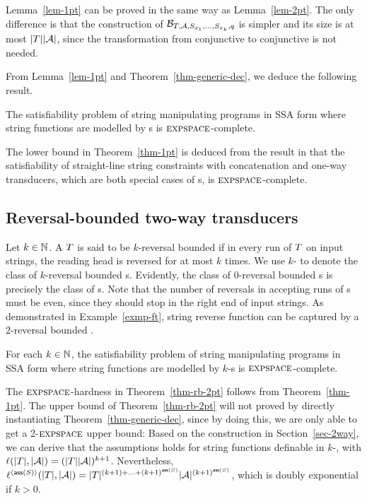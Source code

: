 Lemma~\ref{lem-1pt} can be proved in the same way as Lemma~\ref{lem-2pt}. The only difference is that the construction of $\mathcal{B}_{T, \mathcal{A}, S_{x_1}, \ldots, S_{x_k}, q}$ is simpler and its size is at most $|T| |\mathcal{A}|$, since the transformation from  conjunctive \FFA{} to conjunctive \FA{} is not needed.

From Lemma~\ref{lem-1pt} and Theorem~\ref{thm-generic-dec}, we deduce the following result.
%
\begin{theorem} \label{thm-1pt}
The satisfiability problem of string manipulating programs in SSA form where string functions are modelled by \PT{}s is $\textsc{expspace}$-complete. 
\end{theorem}

The lower bound in Theorem~\ref{thm-1pt} is deduced from the result in \cite{LB16} that the satisfiability of straight-line string constraints with concatenation and one-way transducers, which are both special cases of \PT{}s, is $\textsc{expspace}$-complete.

\subsection{Reversal-bounded two-way transducers}
 
Let $k \in \mathbb{N}$. A \PPT{} $T$ is said  to be $k$-reversal bounded if in every run of $T$ on input strings, the reading head is reversed for at most $k$ times. We use  $k$-\RBPPT{} to denote the class of $k$-reversal bounded \PPT{}s. 
Evidently, the class of $0$-reversal bounded \PPT{}s is precisely the class of \PT{}s. Note that the number of reversals in accepting runs of \PPT{}s must be even, since they should stop in the right end of input strings.  As demonstrated in Example~\ref{exmp-ft}, string reverse function can be captured by a $2$-reversal bounded \PPT.


%
\begin{theorem} \label{thm-rb-2pt}
For each $k \in \mathbb{N}$, the satisfiability problem of string manipulating programs in SSA form where string functions are modelled by $k$-\RBPPT{}s is $\textsc{expspace}$-complete. 
\end{theorem}

The $\textsc{expspace}$-hardness in Theorem~\ref{thm-rb-2pt} follows from Theorem~\ref{thm-1pt}.
The upper bound of Theorem~\ref{thm-rb-2pt} will not proved by directly instantiating Theorem~\ref{thm-generic-dec}, since  by doing this, we are only able to get a 2-$\textsc{expspace}$ upper bound: Based on the construction in Section~\ref{sec-2way}, we can derive that the \prerec{} assumptions holds for string functions definable in $k$-\RBPPT, with $\ell(|T|, |\mathcal{A}|) = (|T||\mathcal{A}|)^{k+1}$. Nevertheless, $\ell^{\langle \mathsf{ass}(S)\rangle}(|T|, |\mathcal{A}|) = |T|^{(k+1) + \ldots + (k+1)^{\mathsf{ass}(S)}} |\mathcal{A}|^{(k+1)^{\mathsf{ass}(S)}}$, which is doubly exponential if $k > 0$.

